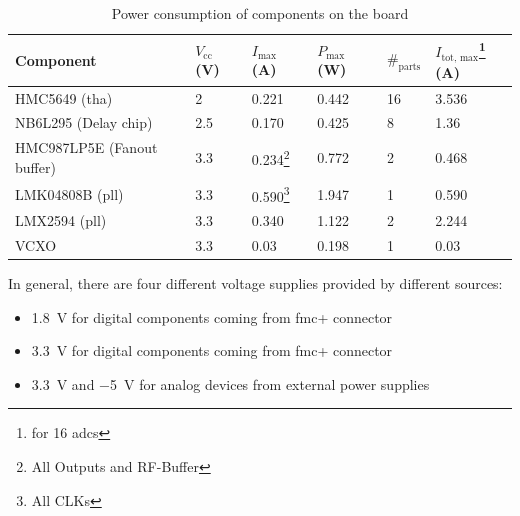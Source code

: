 \begin{table}[tb]
	\caption{Power consumption of components on the board}
	\label{tab:theresacomp}
	\begin{minipage}{\textwidth}
		\centering
		\begin{tabularx}{\textwidth}{Xlllll}
			\toprule
			\textbf{Component}         & $V_\text{cc}$ (V) & $I_\text{max}$ (A)                        & $P_\text{max}$ (W) & $\#_\text{parts}$ & $I_\text{tot, max}$\footnote{for 16 \glspl{adc}} (A) \\ \midrule
			HMC5649 (\gls{tha})        & 2                 & 0.221                                     & 0.442              & 16                & 3.536                                                \\
			NB6L295 (Delay chip)       & 2.5               & 0.170                                     & 0.425              & 8                 & 1.36                                                 \\
			HMC987LP5E (Fanout buffer) & 3.3               & 0.234\footnote{All Outputs and RF-Buffer} & 0.772              & 2                 & 0.468                                                \\
			LMK04808B (\gls{pll})      & 3.3               & 0.590\footnote{All CLKs}                  & 1.947              & 1                 & 0.590                                                \\
			LMX2594 (\gls{pll})        & 3.3               & 0.340                                     & 1.122              & 2                 & 2.244                                                \\
			VCXO                       & 3.3               & 0.03                                      & 0.198              & 1                 & 0.03                                                 \\ \bottomrule
		\end{tabularx}
	\end{minipage}
\end{table}
In general, there are four different voltage supplies provided by different sources:
\begin{itemize}
	\item \SI{1.8}{\volt} for digital components coming from \gls{fmc}+ connector
	\item \SI{3.3}{\volt} for digital components coming from \gls{fmc}+ connector
	\item \SI{3.3}{\volt} and \SI{-5}{\volt} for analog devices from external power supplies 
\end{itemize}
